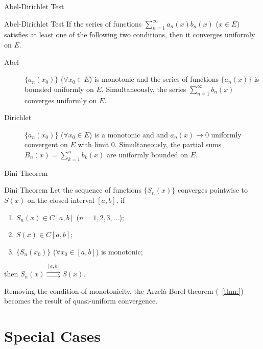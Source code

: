 \documentclass[11pt]{../../TexTemplate/elegantbook}
\begin{document}
\begin{leftbarTitle}{Abel-Dirichlet Test}\end{leftbarTitle}
\begin{theorem}{Abel-Dirichlet Test}
    If the series of functions \( \sum_{n=1}^{\infty} a_n(x) b_n(x) \) (\(x \in E\)) satisfies 
    at least one of the following two conditions, then it converges uniformly on \( E \).
    \begin{description}
        \item[Abel] \( \{ a_n(x_{0}) \} \) (\(\forall x_{0} \in E\)) is monotonic
            and the series of functions \( \{ a_n(x) \} \) is bounded uniformly on \( E \).
            Simultaneously, the series \( \sum_{n=1}^{\infty} b_n(x) \) converges uniformly on \( E \).
        \item[Dirichlet] \( \{ a_n(x_{0}) \} \) (\(\forall x_{0} \in E\)) is a monotonic and 
            and \( a_n(x) \to 0 \) uniformly convergent on \( E \) with limit \(0\).
            Simultaneously, the partial sums \( B_n(x) = \sum_{k=1}^{n} b_k(x) \) are uniformly bounded on \( E \).
    \end{description}
\end{theorem}

\begin{leftbarTitle}{Dini Theorem}\end{leftbarTitle}
\begin{theorem}{Dini Theorem}
    Let the sequence of functions \( \{ S_n(x) \} \) converges pointwise to \( S(x) \) on the closed interval \( [a, b] \),
    if
    \begin{enumerate}
        \item \( S_n(x) \in C[a, b] \) (\( n = 1, 2, 3, \dots \)); 
        \item \( S(x) \in C[a, b] \);
        \item \(\{ S_{n}(x_{0}) \}\) (\(\forall x_{0} \in [a, b]\)) is monotonic;
    \end{enumerate}
    then \( S_n(x) \mathop{\rightrightarrows}\limits^{[a, b]} S(x) \).
\end{theorem}

\begin{remark}
    Removing the condition of monotonicity, the Arzelà-Borel theorem (~\ref{thm:}) becomes the result of quasi-uniform convergence.
\end{remark}

\section{Special Cases}
\end{document}
